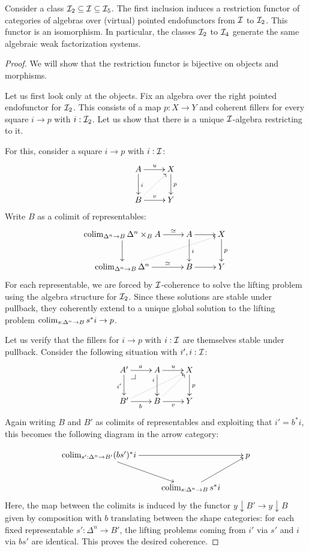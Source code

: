 \documentclass[reqno,10pt,a4paper,oneside]{amsart}
\begin{document}
\begin{lemma}
Consider a class $\cal{I}_2 \subseteq \cal{I} \subseteq \cal{I}_5$.
The first inclusion induces a restriction functor of categories of algebras over (virtual) pointed endofunctors from $\cal{I}$ to $\cal{I}_2$.
This functor is an isomorphism.
In particular, the classes $\cal{I}_2$ to $\cal{I}_4$ generate the same algebraic weak factorization systems.
\end{lemma}

\begin{proof}
We will show that the restriction functor is bijective on objects and morphisms.

Let us first look only at the objects.
Fix an algebra over the right pointed endofunctor for $\cal{I}_2$.
This consists of a map $p : X \to Y$ and coherent fillers for every square $i \to p$ with $i : \cal{I}_2$.
Let us show that there is a unique $\cal{I}$-algebra restricting to it.

For this, consider a square $i \to p$ with $i : \cal{I}$:
\[
\xymatrix{
  A
  \ar[r]^{u}
  \ar[d]^{i}
&
  X
  \ar[d]^{p}
\\
  B
  \ar[r]^{v}
  \ar@{.>}[ur]
&
  Y
}
\]
Write $B$ as a colimit of representables:
\[
\xymatrix{
  \colim_{\Delta^n \to B} \Delta^n \times_B A
  \ar[r]^-{\simeq}
  \ar[d]
&
  A
  \ar[r]
  \ar[d]^{i}
&
  X
  \ar[d]^{p}
\\
  \colim_{\Delta^n \to B} \Delta^n
  \ar[r]^-{\simeq}
  \ar@{.>}[urr]
&
  B
  \ar[r]
&
  Y
}
\]
For each representable, we are forced by $\cal{I}$-coherence to solve the lifting problem using the algebra structure for $\cal{I}_2$.
Since these solutions are stable under pullback, they coherently extend to a unique global solution to the lifting problem $\colim_{s : \Delta^n \to B} s^* i \to p$.

Let us verify that the fillers for $i \to p$ with $i : \cal{I}$ are themselves stable under pullback.
Consider the following situation with $i', i : \cal{I}$:
\[
\xymatrix{
  A'
  \ar[r]^{a}
  \ar[d]_{i'}
  \pullback{dr}
&
  A
  \ar[r]^{u}
  \ar[d]_(0.3){i}
&
  X
  \ar[d]^{p}
\\
  B'
  \ar[r]_{b}
  \ar@{.>}[urr]
&
  B
  \ar[r]_{v}
  \ar@{.>}[ur]
&
  Y
}
\]
Again writing $B$ and $B'$ as colimits of representables and exploiting that $i' = b^* i$, this becomes the following diagram in the arrow category:

\[
\xymatrix{
  \colim_{s' : \Delta^n \to B'} (bs')^* i
  \ar[rr]
  \ar[dr]
&&
  p
\\&
  \colim_{s : \Delta^n \to B} s^* i
  \ar[ur]
}
\]
Here, the map between the colimits is induced by the functor $y \downarrow B' \to y \downarrow B$ given by composition with $b$ translating between the shape categories: for each fixed representable $s' : \Delta^n \to B'$, the lifting problems coming from $i'$ via $s'$ and $i$ via $bs'$ are identical.
This proves the desired coherence.


\end{proof}
\end{document}
